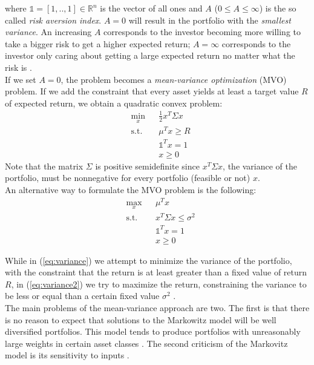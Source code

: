 where $\mathds{1} = [1, .., 1] \in \mathbb{R}^n$ is the vector of all ones and $A$ ($0 \leq A \leq \infty$) is the so called \textit{risk aversion index}. $A = 0$ will result in the portfolio with the \textit{smallest variance}. An increasing $A$ corresponds to the investor becoming more willing to take a bigger risk to get a higher expected return; $A = \infty$ corresponds to the investor only caring about getting a large expected return no matter what the risk is \cite{markovitz}.\\
If we set $A=0$, the problem becomes a \textit{mean-variance
optimization} (MVO) problem. If we add the constraint that every asset yields at least a target value $R$ of expected return, we obtain a quadratic convex problem:
\begin{equation}\label{eq:variance}
\begin{aligned}
&\min_x &&\frac{1}{2}x^T \Sigma x\\
&\text{s.t.}
&&\mu^T x \geq R\\
&&&\mathds{1}^T x=1\\
&&&x \geq 0
\end{aligned}
\end{equation}
Note that the matrix $\Sigma$ is positive semidefinite since $x^T \Sigma x$, the variance of the portfolio, must be nonnegative for every portfolio (feasible or not) $x$.\\
An alternative way to formulate the MVO problem is the following:
\begin{equation}\label{eq:variance2}
\begin{aligned}
&\max_x &&\mu^Tx\\
&\text{s.t.}
&&x^T \Sigma x \leq \sigma^2\\
&&&\mathds{1}^T x=1\\
&&&x \geq 0
\end{aligned}
\end{equation}

While in (\ref{eq:variance}) we attempt to minimize the variance of the portfolio, with the constraint that the return is at least greater than a fixed value of return $R$, in (\ref{eq:variance2}) we try to maximize the return, constraining the variance to be less or equal than a certain fixed value $\sigma^2$ \cite{libro}.\\
The main problems of the mean-variance approach are two. The first is that there is no reason to expect that solutions to the Markowitz model will be well diversified portfolios. This model tends to produce portfolios with unreasonably large weights in certain asset classes \cite{libro}. The second criticism of the Markovitz model is its sensitivity to inputs \cite{tutuncu}.